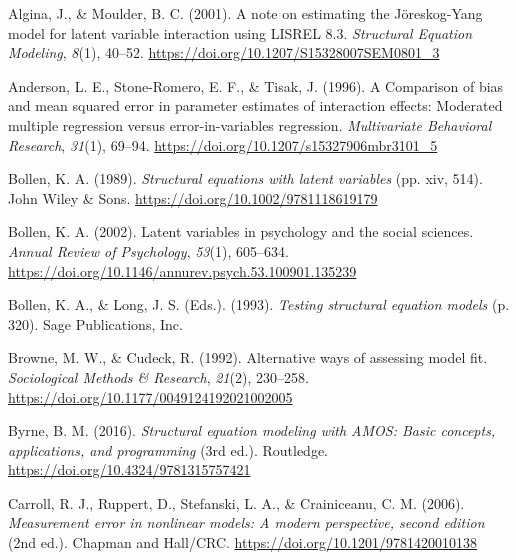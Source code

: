 \documentclass[
  man]{apa6}
\newlength{\cslhangindent}
\newenvironment{CSLReferences}[2] %
 {\begin{list}{}{%
  \setlength{\itemindent}{0pt}
  \setlength{\leftmargin}{0pt}
  \setlength{\parsep}{0pt}
  \ifodd #1
   \setlength{\leftmargin}{\cslhangindent}
   \setlength{\itemindent}{-1\cslhangindent}
  \fi
  \setlength{\itemsep}{#2\baselineskip}}}
 {\end{list}}
\begin{document}
\label{refs}
\begin{CSLReferences}{1}{0}
Algina, J., \& Moulder, B. C. (2001). A note on estimating the {J{ö}reskog-Yang} model for latent variable interaction using {LISREL} 8.3. \emph{Structural Equation Modeling}, \emph{8}(1), 40--52. \url{https://doi.org/10.1207/S15328007SEM0801_3}

Anderson, L. E., Stone-Romero, E. F., \& Tisak, J. (1996). A {Comparison} of bias and mean squared error in parameter estimates of interaction effects: {Moderated} multiple regression versus error-in-variables regression. \emph{Multivariate Behavioral Research}, \emph{31}(1), 69--94. \url{https://doi.org/10.1207/s15327906mbr3101_5}

Bollen, K. A. (1989). \emph{Structural equations with latent variables} (pp. xiv, 514). John Wiley \& Sons. \url{https://doi.org/10.1002/9781118619179}

Bollen, K. A. (2002). Latent variables in psychology and the social sciences. \emph{Annual Review of Psychology}, \emph{53}(1), 605--634. \url{https://doi.org/10.1146/annurev.psych.53.100901.135239}

Bollen, K. A., \& Long, J. S. (Eds.). (1993). \emph{Testing structural equation models} (p. 320). Sage Publications, Inc.

Browne, M. W., \& Cudeck, R. (1992). Alternative ways of assessing model fit. \emph{Sociological Methods \& Research}, \emph{21}(2), 230--258. \url{https://doi.org/10.1177/0049124192021002005}

Byrne, B. M. (2016). \emph{Structural equation modeling with {AMOS}: {Basic} concepts, applications, and programming} (3rd ed.). Routledge. \url{https://doi.org/10.4324/9781315757421}

Carroll, R. J., Ruppert, D., Stefanski, L. A., \& Crainiceanu, C. M. (2006). \emph{Measurement error in nonlinear models: {A} modern perspective, second edition} (2nd ed.). {Chapman and Hall/CRC}. \url{https://doi.org/10.1201/9781420010138}


\end{CSLReferences}
\end{document}
